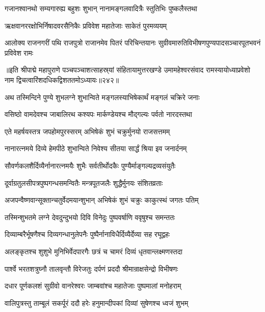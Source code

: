 \twolineshloka
{गजानश्वानथो सम्यगारुह्य बहुशः शुभान्}
{नानामङ्गलवादित्रैः स्तुतिभिः पुष्कलैस्तथा}%

\twolineshloka
{ऋक्षवानररक्षोभिर्निषादवरसैनिकैः}
{प्रविवेश महातेजाः साकेतं पुरमव्ययम्}%

\twolineshloka
{आलोक्य राजनगरीं पथि राजपुत्रो राजानमेव पितरं परिचिन्तयानः}
{सुग्रीवमारुतिविभीषणपुण्यपादसञ्चारपूतभवनं प्रविवेश रामः}%

{॥इति श्रीपाद्मे महापुराणे पञ्चपञ्चाशत्साहस्र्यां संहितायामुत्तरखण्डे उमामहेश्वरसंवाद रामस्यायोध्याप्रवेशो नाम द्विचत्वारिंशदधिकद्विशततमोऽध्यायः॥२४२॥}



\twolineshloka
{अथ तस्मिन्दिने पुण्ये शुभलग्ने शुभान्विते}
{मङ्गलस्याभिषेकार्थं मङ्गलं चक्रिरे जनाः}%

\twolineshloka
{वसिष्ठो वामदेवश्च जाबालिरथ कश्यपः}
{मार्कण्डेयश्च मौद्गल्यः पर्वतो नारदस्तथा}%

\twolineshloka
{एते महर्षयस्तत्र जपहोमपुरस्सरम्}
{अभिषेकं शुभं चक्रुर्मुनयो राजसत्तमम्}%

\twolineshloka
{नानारत्नमये दिव्ये हेमपीठे शुभान्विते}
{निवेश्य सीतया सार्द्धं श्रिया इव जनार्दनम्}%

\twolineshloka
{सौवर्णकलशैर्दिव्यैर्नानारत्नमयैः शुभैः}
{सर्वतीर्थोदकैः पुण्यैर्माङ्गल्यद्रव्यसंयुतैः}%

\twolineshloka
{दूर्वाग्रतुलसीपत्रपुष्पगन्धसमन्वितैः}
{मन्त्रपूतजलैः शुद्धैर्मुनयः संशितव्रताः}%

\twolineshloka
{अजपन्वैष्णवान्सूक्तान्चतुर्वेदमयान्शुभान्}
{अभिषेकं शुभं चक्रुः काकुत्स्थं जगतः पतिम्}%

\twolineshloka
{तस्मिन्शुभतमे लग्ने देवदुन्दुभयो दिवि}
{विनेदुः पुष्पवर्षाणि ववृषुश्च समन्ततः}%

\twolineshloka
{दिव्याम्बरैर्भूषणैश्च दिव्यगन्धानुलेपनैः}
{पुष्पैर्नानाविधैर्दिव्यैर्देव्या सह रघूद्वहः}%

\twolineshloka
{अलङ्कृतश्च शुशुभे मुनिभिर्वेदपारगैः}
{छत्रं च चामरं दिव्यं धृतवान्लक्ष्मणस्तदा}%

\twolineshloka
{पार्श्वे भरतशत्रुघ्नौ तालवृन्तौ विरेजतुः}
{दर्पणं प्रददौ श्रीमान्राक्षसेन्द्रो विभीषणः}%

\twolineshloka
{दधार पूर्णकलशं सुग्रीवो वानरेश्वरः}
{जाम्बवांश्च महातेजाः पुष्पमालां मनोहराम्}%

\twolineshloka
{वालिपुत्रस्तु ताम्बूलं सकर्पूरं ददौ हरेः}
{हनुमान्दीपकां दिव्यां सुषेणश्च ध्वजं शुभम्}%

